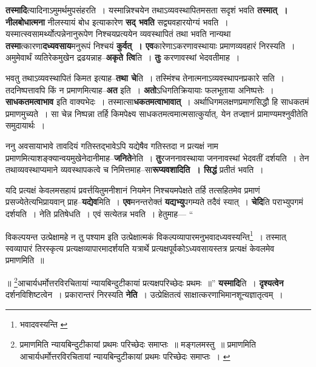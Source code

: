 \documentclass[article,12pt,a4paper]{memoir}
\begin{document}
	  \pstart \textbf{तस्मादि}त्यादिनाऽमुमर्थमुपसंहरति । यस्मान्निश्चयेन तथाऽव्यवस्थापितमसता सदृशं भवति \textbf{तस्मात् । नीलबोधात्मना} नीलस्यायं बोध इत्याकारेण \textbf{सद् भवति} सद्व्यवहारयोग्यं भवति । यस्मात्स्वसामर्थ्योत्पन्नेनानुरूपेण निश्चयप्रत्ययेन व्यवस्थापितं तथा भवति नान्यथा \textbf{तस्मा}त्कारणा\textbf{दध्यवसाय}मनुरूपं निश्चयं \textbf{कुर्वत् । एव}कारेणाऽकरणावस्थायाः प्रमाणव्यवहारं निरस्यति । अमुमेवार्थं व्यतिरेकमुखेन द्रढयन्नाह--\textbf{अकृते त्वि}ति । \textbf{तुः} करणावस्थां भेदवतीमाह ।
	\pend
      

	  \pstart भवतु तथाऽव्यवस्थापितं किमत इत्याह--\textbf{तथा चे}ति । तस्मिंश्च तेनात्मनाऽव्यवस्थापनप्रकारे सति । तदनिष्पत्तावपि किं न प्रमाणमित्याह--\textbf{अत} इति । \textbf{अतो}ऽधिगतिक्रियायाः फलभूताया अनिष्पत्तेः । \textbf{साधकतमत्वाभाव} इति वाक्यभेदः । तस्मात्सा\textbf{धकतमत्वाभावात्} । अर्थाधिगमलक्षणप्रमाणसिद्धौ हि साधकतमं प्रमाणमुच्यते । सा चेन्न निष्पन्ना तर्हि किमपेक्ष्य साधकतमत्वमात्मसात्कुर्यात्, येन तज्ज्ञानं प्रामाण्यमश्नुवीतेति समुदायार्थः ।
	\pend
      

	  \pstart ननु अवसायाभावे तावदियं गतिस्तद्भावेऽपि यद्येषैव गतिस्तदा न प्रत्यक्षं नाम प्रमाणमित्याशङ्क्यान्वयमुखेनेदानीमाह--\textbf{जनिते}नेति । \textbf{तु}रजननावस्थाया जननावस्थां भेदवतीं दर्शयति । तेन तथाव्यवस्थाप्यमाने व्यवस्थापकत्वे च निमित्तमाह--सा\textbf{रूप्यवशादिति । सिद्धं} प्रतीतं भवति ।
	\pend
      

	  \pstart यदि प्रत्यक्षं केवलमसहायं प्रवर्त्तयितुमनीशानं नियमेन निश्चयमपेक्षते तर्हि तत्सहितमेव प्रमाणं प्रसज्येतेत्यभिप्रायवान् प्राह--\textbf{यद्येव}मिति । \textbf{एव}मनन्तरोक्तं \textbf{यद्यभ्यु}पगम्यते तदैवं स्यात् । \textbf{चेदि}ति पराभ्युपगमं दर्शयति । नेति प्रतिषेधति । एवं सत्येतन्न भवति । हेतुमाह—  \leavevmode{} “
	  
	विकल्पयन्त उत्प्रेक्षामहे न तु पश्याम इति उत्प्रेक्षात्मकं विकल्पव्यापारमनुभवादध्यवस्यन्ति\footnote{भवादवस्यन्ति \cite{dp-msA} \cite{dp-msC} \cite{dp-edP} \cite{dp-edH} \cite{dp-edE} \cite{dp-edN}} । तस्मात् स्वव्यापारं तिरस्कृत्य प्रत्यक्षव्यापारमादर्शयति यत्रार्थे प्रत्यक्षपूर्वकोऽध्यवसायस्तत्र प्रत्यक्षं केवलमेव प्रमाणमिति ॥ 
	  
	॥ \footnote{प्रमाणमिति न्यायबिन्दुटीकायां प्रथमः परिच्छेदः समाप्तः ॥ मङ्गलमस्तु ॥ \cite{dp-msA} प्रमाणमिति आचार्यधर्मोत्तरविरचितायां न्यायबिन्दुटीकायां प्रथमः परिच्छेदः समाप्तः । \cite{dp-msC}}आचार्यधर्मोत्तरविरचितायां न्यायबिन्दुटीकायां प्रत्यक्षपरिच्छेदः प्रथमः ॥” \textbf{यस्मादि}ति । \textbf{दृश्यत्वेन} दर्शनविशिष्टत्वेन । प्रकारान्तरं निरस्यति \textbf{नेति} । उत्प्रेक्षितत्वं साक्षात्करणाभिमानशून्यज्ञातृत्वम् ।
	\pend
      
\end{document}
